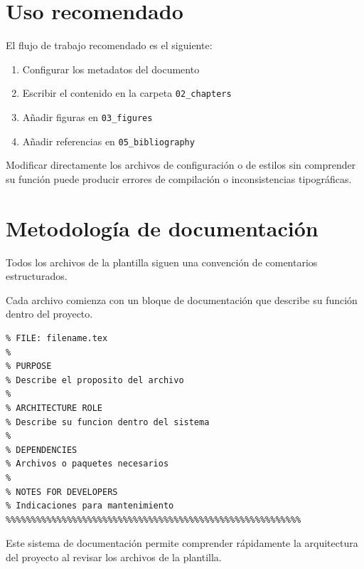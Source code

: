 



\section{Uso recomendado}

El flujo de trabajo recomendado es el siguiente:

\begin{enumerate}
\item Configurar los metadatos del documento
\item Escribir el contenido en la carpeta \texttt{02\_chapters}
\item Añadir figuras en \texttt{03\_figures}
\item Añadir referencias en \texttt{05\_bibliography}
\end{enumerate}



\begin{warningbox}
Modificar directamente los archivos de configuración
o de estilos sin comprender su función puede producir
errores de compilación o inconsistencias tipográficas.
\end{warningbox}




\section{Metodología de documentación}

Todos los archivos de la plantilla siguen una convención
de comentarios estructurados.

Cada archivo comienza con un bloque de documentación
que describe su función dentro del proyecto.

\begin{lstlisting}[caption={Bloque de documentación estándar},label={code:docblock}]
%%%%%%%%%%%%%%%%%%%%%%%%%%%%%%%%%%%%%%%%%%%%%%%%%%%%%%%%%%
% FILE: filename.tex
%
% PURPOSE
% Describe el proposito del archivo
%
% ARCHITECTURE ROLE
% Describe su funcion dentro del sistema
%
% DEPENDENCIES
% Archivos o paquetes necesarios
%
% NOTES FOR DEVELOPERS
% Indicaciones para mantenimiento
%%%%%%%%%%%%%%%%%%%%%%%%%%%%%%%%%%%%%%%%%%%%%%%%%%%%%%%%%%
\end{lstlisting}




\begin{examplebox}
Este sistema de documentación permite comprender
rápidamente la arquitectura del proyecto al revisar
los archivos de la plantilla.
\end{examplebox}
